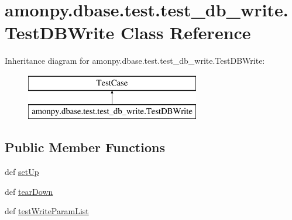 \hypertarget{classamonpy_1_1dbase_1_1test_1_1test__db__write_1_1_test_d_b_write}{\section{amonpy.\-dbase.\-test.\-test\-\_\-db\-\_\-write.\-Test\-D\-B\-Write Class Reference}
\label{classamonpy_1_1dbase_1_1test_1_1test__db__write_1_1_test_d_b_write}
}
Inheritance diagram for amonpy.\-dbase.\-test.\-test\-\_\-db\-\_\-write.\-Test\-D\-B\-Write\-:\begin{figure}[H]
\begin{center}
\leavevmode
\includegraphics[height=2.000000cm]{classamonpy_1_1dbase_1_1test_1_1test__db__write_1_1_test_d_b_write}
\end{center}
\end{figure}
\subsection*{Public Member Functions}
\begin{DoxyCompactItemize}
\item 
def \hyperlink{classamonpy_1_1dbase_1_1test_1_1test__db__write_1_1_test_d_b_write_a8ef76286fea5446138811375fb7f66b5}{set\-Up}
\item 
def \hyperlink{classamonpy_1_1dbase_1_1test_1_1test__db__write_1_1_test_d_b_write_aa32d3bef1374ed78d24d9576db67efab}{tear\-Down}
\item 
def \hyperlink{classamonpy_1_1dbase_1_1test_1_1test__db__write_1_1_test_d_b_write_a02684496f0a6f809cc60ab8873b125c8}{test\-Write\-Param\-List}
\end{DoxyCompactItemize}
